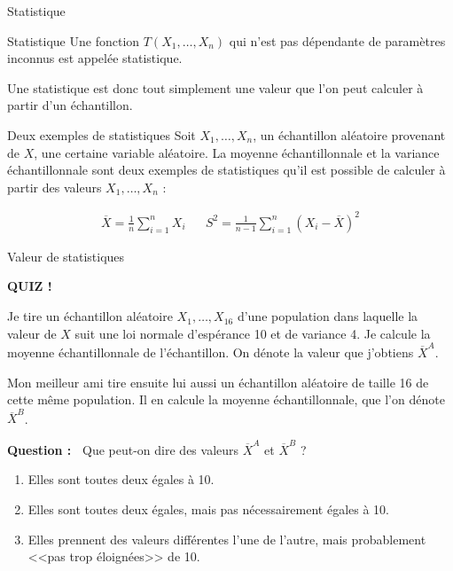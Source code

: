 \documentclass{BeamerTemplate}
\begin{document}
\begin{frame}{Statistique}
\begin{Boite}{Statistique}
    Une fonction $T(X_1,\hdots,X_n)$ qui n'est pas dépendante de paramètres inconnus est appelée \alert{statistique}.
\end{Boite}
    

    Une statistique est donc tout simplement une valeur que l'on peut calculer à partir d'un échantillon.


\end{frame}

\begin{frame}{Deux exemples de statistiques}
    Soit $X_1,\hdots,X_n$, un échantillon aléatoire provenant de $X$, une certaine variable aléatoire. La moyenne échantillonnale et la variance échantillonnale sont deux exemples de statistiques qu'il est possible de calculer à partir des valeurs $X_1,\dots,X_n$ :

    \begin{align*}
        \overline{X}=\frac{1}{n}\sum_{i=1}^n X_i & & S^2=\frac{1}{n-1}\sum_{i=1}^n(X_i-\overline{X})^2
    \end{align*}

    
\end{frame}

\begin{frame}[t]{Valeur de statistiques}
    
\centerline{\LARGE\bf\alert{QUIZ !}}

  \vspace{2mm}
  Je tire un échantillon aléatoire $X_1,\dots,X_{16}$ d'une population dans laquelle la valeur de $X$ suit une loi normale d'espérance
  10 et de variance 4. Je calcule la moyenne échantillonnale de l'échantillon. On dénote la valeur que j'obtiens $\overline{X}^A$.

  Mon meilleur ami tire ensuite lui aussi un échantillon aléatoire de taille 16 de cette même population. Il en calcule la moyenne échantillonnale, que l'on dénote $\overline{X}^B$.

  {\bf Question :\ } Que peut-on dire des valeurs $\overline{X}^A$ et $\overline{X}^B$ ?
  \begin{enumerate}
      \item[(a)] Elles sont toutes deux égales à 10.
      \item[(b)] Elles sont toutes deux égales, mais pas nécessairement égales à 10.
      \item[(c)] Elles prennent des valeurs différentes l'une de l'autre, mais probablement <<pas trop éloignées>> de 10.
  \end{enumerate}
 \vspace{5cm}
\end{frame}
\end{document}
